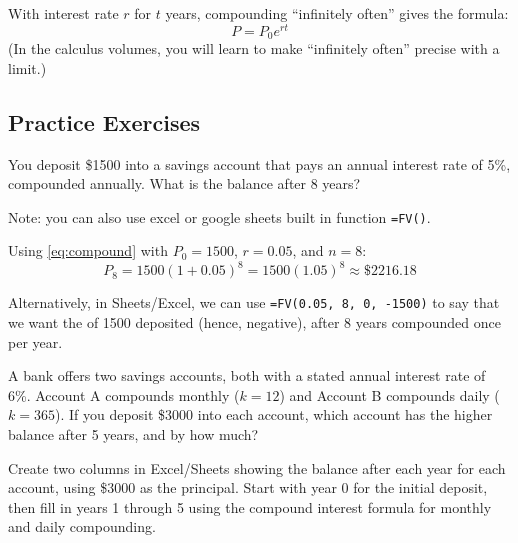 With interest rate $r$ for $t$ years, compounding ``infinitely often''
gives the  formula:
\begin{equation}\label{eq:continuous_compound}
  P = P_0e^{rt}
\end{equation}
(In the calculus volumes, you will learn to make ``infinitely often''
precise with a limit.)

\subsection{Practice Exercises}

\begin{Exercise}[label=compoundinterest1]
You deposit \$1500 into a savings account that pays an annual interest
rate of 5\%, compounded annually. What is the balance after 8 years?

Note: you can also use excel or google sheets built in function \texttt{=FV()}.
\end{Exercise}

\begin{Answer}[ref=compoundinterest1]
Using \ref{eq:compound} with $P_0 = 1500$, $r = 0.05$, and $n = 8$:
$$P_8 = 1500 (1+0.05)^8 = 1500 (1.05)^8 \approx \$2216.18$$

Alternatively, in Sheets/Excel, we can use \texttt{=FV(0.05, 8, 0, -1500)} to say that we want the  of 1500 deposited (hence, negative), after 8 years compounded once per year.
\end{Answer}

\begin{Exercise}[label=compoundinterest2]
A bank offers two savings accounts, both with a stated annual interest
rate of 6\%. Account A compounds monthly ($k = 12$) and Account B
compounds daily ($k = 365$). If you deposit \$3000 into each account,
which account has the higher balance after 5 years, and by how much?

Create two columns in Excel/Sheets showing the balance after each year
for each account, using \$3000 as the principal. Start with year 0 for the
initial deposit, then fill in years 1 through 5 using the compound
interest formula for monthly and daily compounding.
\end{Exercise}


